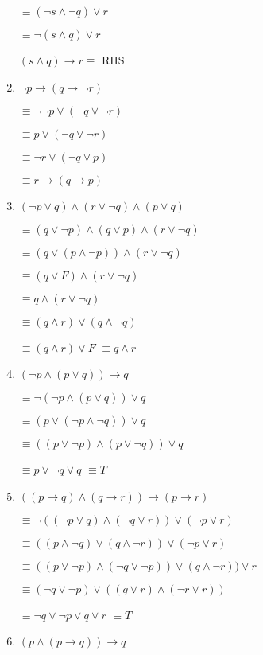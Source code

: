 \documentclass{sig-alternate-05-2015}
\begin{document}
\begin{enumerate}
$\equiv(\neg s \wedge \neg q) \vee r $

$\equiv\neg ( s \wedge q) \vee r $

$(s \wedge q)\rightarrow r \equiv$ RHS 

\item  $\neg p \rightarrow (q \rightarrow \neg r)$

$\equiv \neg \neg p \vee (\neg q \vee \neg r)$

$\equiv  p \vee (\neg q \vee \neg r)$

$\equiv  \neg r \vee (\neg q \vee p)$

$\equiv r \rightarrow (q \rightarrow p)$

\item $(\neg p \vee q) \wedge (r \vee \neg q) \wedge (p \vee q)$

$ \equiv (q \vee \neg p)\wedge (q \vee p) \wedge (r \vee \neg q) $

$\equiv(q\vee (p \wedge \neg p)) \wedge (r \vee \neg q)$

$\equiv(q\vee F)\wedge (r \vee \neg q)$

$\equiv q \wedge (r \vee \neg q)$

$\equiv (q \wedge r )\vee( q \wedge \neg q)$

$\equiv (q\wedge r)\vee F$
$\equiv q\wedge r$

\item $(\neg p \wedge (p \vee q))\rightarrow q$

$\equiv \neg (\neg p \wedge (p \vee q))\vee q$

$\equiv  ( p \vee (\neg p \wedge \neg q))\vee q$

$\equiv  ( (p \vee \neg p) \wedge (p \vee \neg q))\vee q$

$\equiv   p \vee \neg q \vee q$ $\equiv  T$
\item $((p\rightarrow q)\wedge (q\rightarrow r)) \rightarrow (p\rightarrow r)$

$\equiv \neg ((\neg p\vee q)\wedge (\neg q\vee r)) \vee(\neg p\vee r)$

$\equiv (( p\wedge \neg q)\vee (q\wedge \neg r)) \vee(\neg p\vee r)$

$\equiv (( p\vee \neg p)\wedge (\neg q \vee \neg p))\vee (q\wedge \neg r)) \vee r$

$\equiv  (\neg q \vee \neg p)\vee ((q\vee r)\wedge (\neg r\vee r))$

$\equiv  \neg q \vee \neg p\vee q\vee r$ $\equiv T$
\item $(p\wedge (p \rightarrow q))\rightarrow q$


\end{enumerate}
\end{document}
